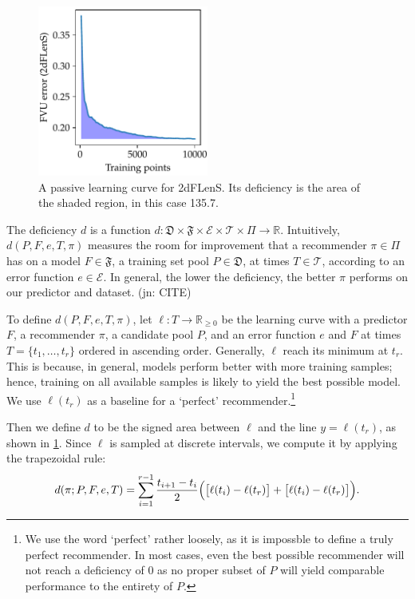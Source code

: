 \documentclass[11pt,twoside,openright]{report}
\newcommand\bbR{\mathbb{R}}
\newcommand\cE{\mathcal{E}}
\newcommand\cT{\mathcal{T}}
\newcommand\fD{\mathfrak{D}}
\newcommand\fF{\mathfrak{F}}
\newcommand\jn[1]{{\color{red}(jn: #1)}}
\begin{document}
\begin{figure}
    \centering
    \includegraphics[width=0.5\textwidth]{deficiency_example.pdf}
    \caption{A passive learning curve for 2dFLenS. Its deficiency is the area of the shaded region, in this case 135.7.}
    \label{fig:deficiency_example}
  \end{figure}

The deficiency $d$ is a function $d : \fD \times \fF \times \cE \times \cT \times \Pi \to \bbR$. Intuitively, $d(P, F, e, T, \pi)$ measures the room for improvement that a recommender $\pi \in \Pi$ has on a model $F \in \fF$, a training set pool $P \in \fD$, at times $T \in \cT$, according to an error function $e \in \cE$. In general, the lower the deficiency, the better $\pi$ performs on our predictor and dataset. \jn{CITE}

To define $d(P, F, e, T, \pi)$, let $\ell : T \to \bbR_{\geq0}$ be the learning curve with a predictor $F$, a recommender $\pi$, a candidate pool $P$, and an error function $e$ and $F$ at times $T = \{t_1, \dots, t_r\}$ ordered in ascending order. Generally, $\ell$ reach its minimum at $t_r$. This is because, in general, models perform better with more training samples; hence, training on all available samples is likely to yield the best possible model. We use $\ell(t_r)$ as a baseline for a `perfect' recommender.\footnote{We use the word `perfect' rather loosely, as it is impossble to define a truly perfect recommender. In most cases, even the best possible recommender will not reach a deficiency of $0$ as no proper subset of $P$ will yield comparable performance to the entirety of $P$.}

Then we define $d$ to be the signed area between $\ell$ and the line $y = \ell(t_r)$, as shown in \cref{fig:deficiency_example}. Since $\ell$ is sampled at discrete intervals, we compute it by applying the trapezoidal rule: \[
  d(\pi; P, F, e, T) = \sum_{i=1}^{r-1} \frac{t_{i+1} - t_i}{2}\Big(\big[\ell(t_i) - \ell(t_r)\big] + \big[\ell(t_i) - \ell(t_r)\big]\Big) \text.
\]
\end{document}
